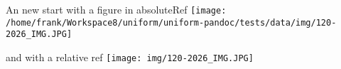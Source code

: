 \documentclass[a4paper,10pt]{scrbook}
\begin{document}
An new start
with a figure in absoluteRef 
\texttt{[image: /home/frank/Workspace8/uniform/uniform-pandoc/tests/data/img/120-2026\_IMG.JPG]}

and with a relative ref 
\texttt{[image: img/120-2026\_IMG.JPG]}


\printindex
\end{document}
